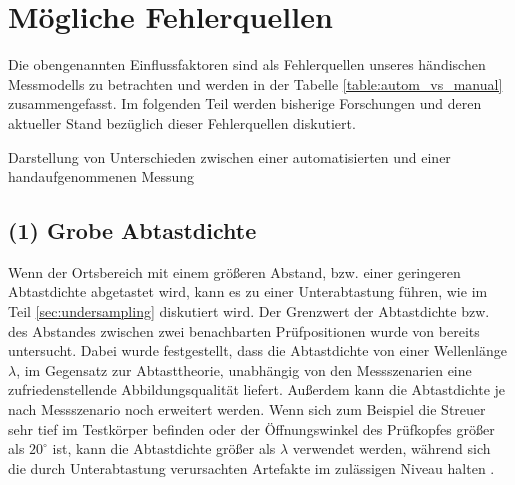 %



\section{Mögliche Fehlerquellen} \label{sec:error_sources}
Die obengenannten Einflussfaktoren sind als Fehlerquellen unseres händischen Messmodells zu betrachten und werden in der Tabelle \ref{table:autom_vs_manual} zusammengefasst. Im folgenden Teil werden bisherige Forschungen und deren aktueller Stand bezüglich dieser Fehlerquellen diskutiert. \par
\begin{table}[ht]
\begin{center}

\caption[Unterschieden zwischen einer automatischen und handaufgenommenen Messung]{Darstellung von Unterschieden zwischen einer automatisierten und einer handaufgenommenen Messung}
\label{table:autom_vs_manual}
\end{center}
\end{table}

\subsection*{(1) Grobe Abtastdichte}%
Wenn der Ortsbereich mit einem größeren Abstand, bzw. einer geringeren Abtastdichte abgetastet wird, kann es zu einer Unterabtastung führen, wie  im Teil \ref{sec:undersampling} diskutiert wird. Der Grenzwert der Abtastdichte bzw. des Abstandes zwischen zwei benachbarten Prüfpositionen wurde von \cite{Mooshofer16SAFTwithBiggerGridandArtifacts} bereits untersucht. Dabei wurde festgestellt, dass die Abtastdichte von einer Wellenlänge $\lambda$, im Gegensatz zur Abtasttheorie, unabhängig von den Messszenarien eine zufriedenstellende Abbildungsqualität liefert. Außerdem kann die Abtastdichte je nach Messszenario noch erweitert werden. Wenn sich zum Beispiel die Streuer sehr tief im Testkörper befinden oder der Öffnungswinkel des Prüfkopfes größer als $20^{\circ}$ ist, kann die Abtastdichte größer als $\lambda$ verwendet werden, während sich die durch Unterabtastung verursachten Artefakte im zulässigen Niveau halten \cite{Mooshofer16SAFTwithBiggerGridandArtifacts}. \par

